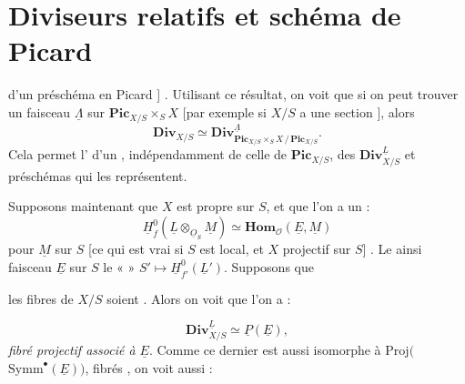 \documentclass[11pt,a4paper]{article}
\begin{document}
\section{Diviseurs relatifs et schéma de Picard}

d'un préschéma en Picard \ill{}] \struck{\ill{}}. Utilisant ce résultat, on
voit que si on peut trouver un faisceau 
 \struck{\ill{} $\underline{\Lambda}$}
$\underline{\Lambda}$ sur $\mathbf{Pic}_{X/S} \times_S X$ 
[par exemple si $X/S$ a une section \ill{}], alors 
\[
  \mathbf{Div}_{X/S} \simeq
  \mathbf{Div}^{\underline{\Lambda}}_{\mathbf{Pic}_{X/S} \times_S X \,/\, \mathbf{Pic}_{X/S}} .
\]
Cela permet l' d'un 
, indépendamment de celle de $\mathbf{Pic}_{X/S}$, des
  $\mathbf{Div}^{\underline{L}}_{X/S}$
et   préschémas qui \ill{} les
représentent.

Supposons maintenant que $X$ est propre  sur $S$, et que
l'on a un   :
\[
  \underline{H}^0_f(\underline{L} \otimes_{\underline{O}_S} \underline{M})
  \simeq \mathbf{Hom}_{\mathcal{O}}(\underline{E}, \underline{M})
\]
pour $\underline{M}$  sur $S$ [ce qui est vrai si $S$
est local, et $X$ projectif sur $S$] \struck{\ill{}}. Le \ill{} ainsi \ill{}
faisceau  $\underline{E}$ sur $S$ 
 le «  » $S' \mapsto \underline{H}^0_{f'}(\underline{L}')$.
Supposons \emph{} que

les fibres de $X/S$ soient \ill{}  .
Alors on voit que l'on a :

\[
  \mathbf{Div}^{\underline{L}}_{X/S} \simeq \underline{P}(\underline{E}),
\]
\emph{fibré projectif associé à $\underline{E}$}. Comme ce dernier est aussi
isomorphe à $\mathrm{Proj}($ $\mathrm{Symm}^{\bullet}(\underline{E}))$,
 \ill{} fibrés \ill{}, on voit aussi :
\end{document}
